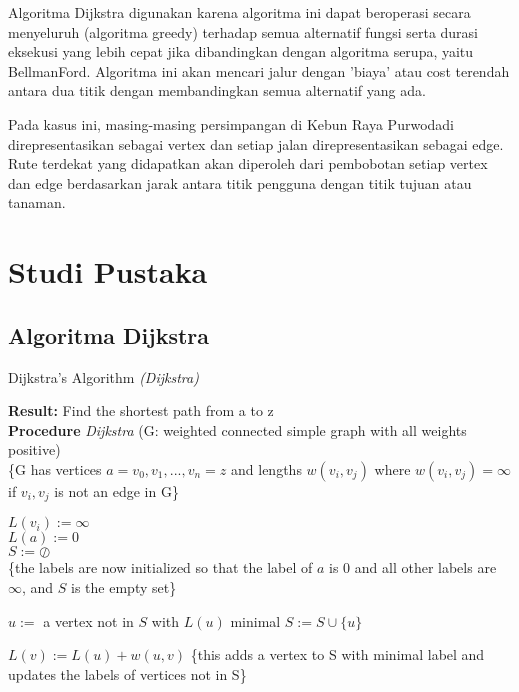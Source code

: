 \documentclass[conference]{IEEEtran}
\begin{document}
    Algoritma Dijkstra digunakan karena algoritma ini dapat beroperasi secara menyeluruh (algoritma greedy) terhadap semua alternatif fungsi serta durasi eksekusi yang lebih cepat jika dibandingkan dengan algoritma serupa, yaitu BellmanFord. Algoritma ini akan mencari jalur dengan ’biaya’ atau cost terendah antara dua titik dengan membandingkan semua alternatif yang ada.

    Pada kasus ini, masing-masing persimpangan di Kebun Raya Purwodadi direpresentasikan sebagai vertex dan setiap jalan direpresentasikan sebagai edge. Rute terdekat yang didapatkan akan diperoleh dari pembobotan setiap vertex dan edge berdasarkan jarak antara titik pengguna dengan titik tujuan atau tanaman.
    

\section{Studi Pustaka}
    \subsection{Algoritma Dijkstra}
        \begin{algorithm}
        \caption{Dijkstra's Algorithm \textit{(Dijkstra)}}
        \textbf{Result: }Find the shortest path from a to z\\
        \textbf{Procedure }\textit{Dijkstra} (G: weighted connected simple graph with all weights positive)\\
        \textnormal\{G has vertices $a = v_0, v_1, ..., v_n = z$ and lengths $w(v_i, v_j)$ where $w(v_i, v_j) = \infty$ if $v_i , v_j$ is not an edge in G\}
        \begin{algorithmic}[1]

            \State $L(v_i) := \infty$
        \\

        $L(a) := 0$\\
        $S := \oslash $\\
        \{the labels are now initialized so that the label of $a$ is 0 and all other labels are $\infty$, and $S$ is the empty set\}

            \State $u := $ a vertex not in $S$ with $L(u)$ minimal
            \State $S := S \cup \{u\}$
            
                    \State $L(v) := L(u) + w(u, v)$
                    \State \{this adds a vertex to S with minimal label
                    \State and updates the labels of vertices not in S\}

        \\
       
        \end{algorithmic}
        \end{algorithm}
\end{document}
